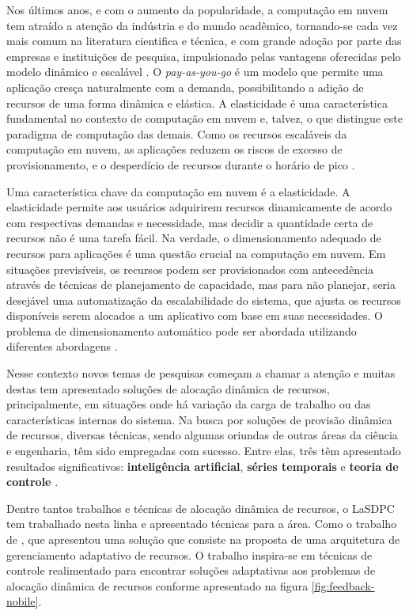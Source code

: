 Nos últimos anos, e com o aumento da popularidade, a computação em nuvem tem atraído a atenção da indústria e do mundo acadêmico, tornando-se cada vez mais comum na literatura cientifica e técnica, e com grande adoção por parte das empresas e instituições de pesquisa, impulsionado pelas vantagens oferecidas pelo modelo dinâmico e escalável . O \textit{pay-as-you-go} é um modelo que permite uma aplicação cresça naturalmente com a demanda, possibilitando a adição de recursos de uma forma dinâmica e elástica. A elasticidade é uma característica fundamental no contexto de computação em nuvem e, talvez, o que distingue este paradigma de computação das demais. Como os recursos escaláveis da computação em nuvem, as aplicações reduzem os riscos de excesso de provisionamento, e o desperdício de recursos durante o horário de pico \cite{vazquez2014, galante2012}.

Uma característica chave da computação em nuvem é a elasticidade. A elasticidade permite aos usuários adquirirem recursos dinamicamente de acordo com respectivas demandas e necessidade, mas decidir a quantidade certa de recursos não é uma tarefa fácil. Na verdade, o dimensionamento adequado de recursos para aplicações é uma questão crucial na computação em nuvem. Em situações previsíveis, os recursos podem ser provisionados com antecedência através de técnicas de planejamento de capacidade, mas para não planejar, seria desejável uma automatização da escalabilidade do sistema, que ajusta os recursos disponíveis serem alocados a um aplicativo com base em suas necessidades. O problema de dimensionamento automático pode ser abordada utilizando diferentes abordagens \cite{Tania2012}.  

Nesse contexto novos temas de pesquisas começam a chamar a atenção e muitas destas tem apresentado soluções de alocação dinâmica de recursos, principalmente, em situações onde há variação da carga de trabalho ou das características internas do sistema. 
Na busca por soluções de provisão dinâmica de recursos, diversas técnicas, sendo algumas oriundas de outras áreas da ciência e engenharia, têm sido empregadas com sucesso. Entre elas, três têm apresentado resultados significativos: \textbf{inteligência artificial}, \textbf{séries temporais} e \textbf{teoria de controle} \cite{Nobile2013}.

Dentre tantos trabalhos e técnicas de alocação dinâmica de recursos, o LaSDPC tem trabalhado nesta linha e apresentado técnicas para a área. Como o trabalho de , que apresentou uma solução que consiste na proposta de uma arquitetura de gerenciamento adaptativo de recursos. O trabalho inspira-se em técnicas de controle realimentado para encontrar soluções adaptativas aos problemas de alocação dinâmica de recursos conforme apresentado na figura \ref{fig:feedback-nobile}.

